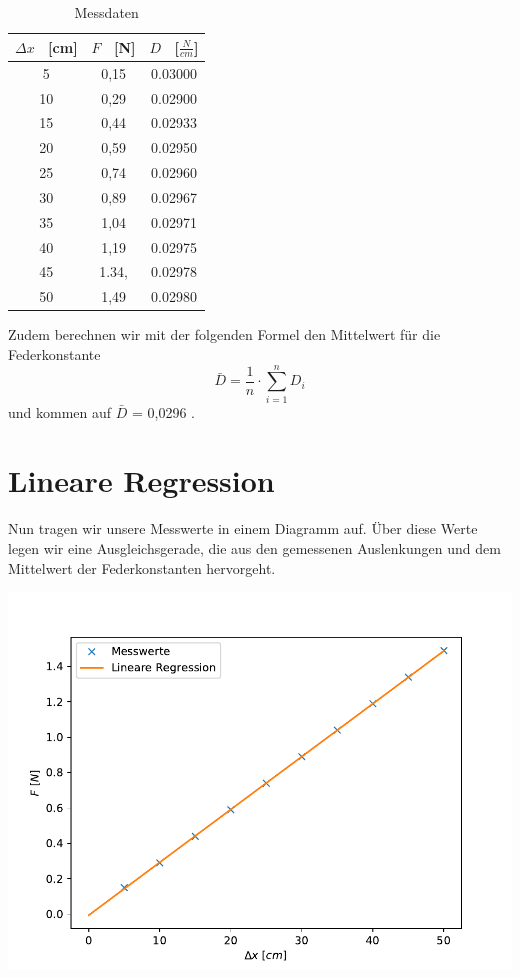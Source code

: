 \documentclass[titlepage = firstcover]{scrartcl}
\begin{document}
      \begin{table}[h]
        \centering
        \caption{Messdaten}
        \label{tab:Tabelle_1}
        
        \begin{tabular}{c c c}
            \toprule
            {$\Delta x$ \ [cm]} & {$F$ \ [N]} & {$D$ \ [$\frac{N}{cm}$]}\\
            \midrule
            5 & 0,15 & 0.03000\\
            10 & 0,29 & 0.02900\\
            15 & 0,44 & 0.02933\\
            20 & 0,59 & 0.02950\\
            25 & 0,74 & 0.02960\\
            30 & 0,89 & 0.02967\\
            35 & 1,04 & 0.02971\\
            40 & 1,19 & 0.02975\\
            45 & 1.34, & 0.02978\\
            50 & 1,49 & 0.02980\\
            \bottomrule
        \end{tabular}    
    \end{table}

    \newpage
    Zudem berechnen wir mit der folgenden Formel den Mittelwert für die Federkonstante 
      \begin{equation}
        \bar{D} = \frac{1}{n} \cdot \sum_{i=1}^{n} D_{i}
      \end{equation}  
    und kommen auf $\bar{D}$ = 0,0296 . 

        
    \section{Lineare Regression}
      Nun tragen wir unsere Messwerte in einem Diagramm auf. Über diese Werte legen wir
      eine Ausgleichsgerade, die aus den gemessenen Auslenkungen und dem Mittelwert der Federkonstanten hervorgeht.
      
      \includegraphics[width=0.7\linewidth]{Hookgraph.pdf}

        
\end{document}

